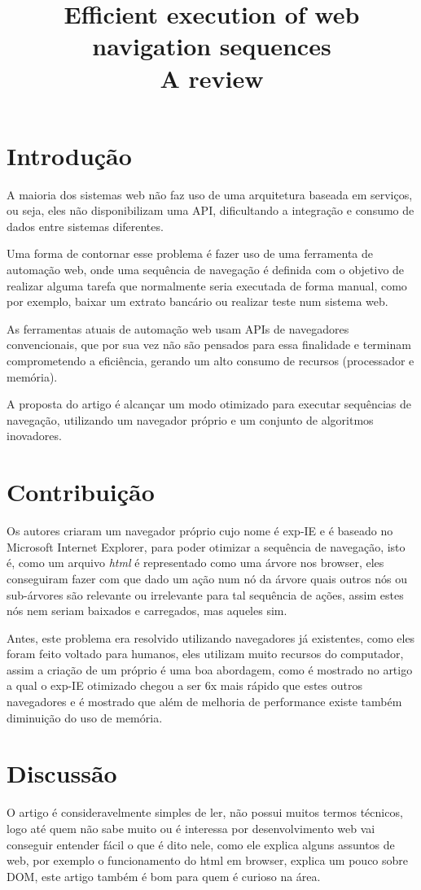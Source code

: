 \documentclass[conference]{IEEEtran}
\title{Efficient execution of web navigation sequences \cite{art:main}
  \\ A review}
\author{
  \IEEEauthorblockA{Universidade Federal de Alagoas -- Instituto de Computação
    \\ Professor: André Lage Freitas -- Matéria: Sistema Distribuídos}
  \IEEEauthorblockN{Revisado por: \textbf{Bruno da Silva Belo} (12110981)
    e \textbf{Iago Barbosa de Souza} (14210353) em 2016-08-13}
}
\begin{document}
\maketitle

\section{Introdução}
\label{sec:intro}
A maioria dos sistemas web não faz uso de uma arquitetura baseada em serviços,
ou seja, eles não disponibilizam uma API, dificultando a integração e consumo
de dados entre sistemas diferentes.

Uma forma de contornar esse problema é fazer uso de uma ferramenta de automação
web, onde uma sequência de navegação é definida com o objetivo de realizar
alguma tarefa que normalmente seria executada de forma manual, como por exemplo,
baixar um extrato bancário ou realizar teste num sistema web.

As ferramentas atuais de automação web usam APIs de navegadores convencionais,
que por sua vez não são pensados para essa finalidade e terminam comprometendo
a eficiência, gerando um alto consumo de recursos (processador e memória).

A proposta do artigo é alcançar um modo otimizado para executar sequências de
navegação, utilizando um navegador próprio e um conjunto de algoritmos
inovadores.
\section{Contribuição}
\label{sec:contrib}
Os autores criaram um navegador próprio cujo nome é exp-IE e é baseado no
Microsoft Internet Explorer, para poder otimizar a sequência de navegação, isto
é, como um arquivo \emph{html} é representado como uma árvore nos browser, eles
conseguiram fazer com que dado um ação num nó da árvore quais outros nós ou
sub-árvores são relevante ou irrelevante para tal sequência de ações, assim
estes nós nem seriam baixados e carregados, mas aqueles sim.

Antes, este problema era resolvido utilizando navegadores já existentes, como
eles foram feito voltado para humanos, eles utilizam muito recursos do
computador, assim a criação de um próprio é uma boa abordagem, como é mostrado
no artigo a qual o exp-IE otimizado chegou a ser 6x mais rápido que estes outros
navegadores e é mostrado que além de melhoria de performance existe também
diminuição do uso de memória.
\section{Discussão}
\label{sec:discussao}
O artigo\cite{art:main} é consideravelmente simples de ler, não possui muitos
termos técnicos, logo até quem não sabe muito ou é interessa por desenvolvimento
web vai conseguir entender fácil o que é dito nele, como ele explica alguns
assuntos de web, por exemplo o funcionamento do html em browser, explica um
pouco sobre DOM, este artigo também é bom para quem é curioso na área.
\end{document}
